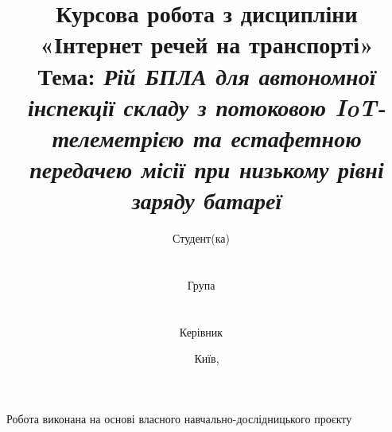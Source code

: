 \documentclass[12pt,a4paper]{article}
\title{
  \vspace{-2cm}
  \textbf{Курсова робота з дисципліни\\
  «Інтернет речей на транспорті»}\\[1em]
  \large Тема: \textit{Рій БПЛА для автономної інспекції складу з потоковою IoT-телеметрією та естафетною передачею місії при низькому рівні заряду батареї}
}
\author{
  Студент(ка)~~\rule{4cm}{0.4pt}\\
  Група~~\rule{2cm}{0.4pt}\\[1em]
  Керівник~~\rule{4cm}{0.4pt}
}
\date{Київ, \the\year}
\begin{document}
\maketitle
\thispagestyle{empty}

\vspace{2cm}
\begin{center}
\large
Робота виконана на основі власного навчально-дослідницького проєкту \\
\warehouseslamurl
\end{center}

\newpage
\tableofcontents
\newpage









\newpage
{}
\renewcommand{\refname}{Джерела інформації}

\end{document}

